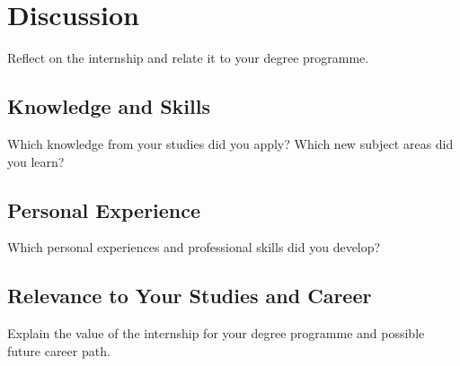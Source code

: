 \chapter{Discussion}
\label{chap:discussion}

Reflect on the internship and relate it to your degree programme.

\section{Knowledge and Skills}
Which knowledge from your studies did you apply? Which new subject areas did you learn?

\section{Personal Experience}
Which personal experiences and professional skills did you develop?

\section{Relevance to Your Studies and Career}
Explain the value of the internship for your degree programme and possible future career path.
